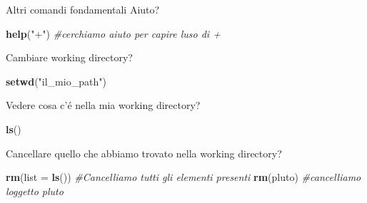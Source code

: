 \documentclass[
  ignorenonframetext,
]{beamer}
\newenvironment{Shaded}{\begin{snugshade}}{\end{snugshade}}
\newcommand{\CommentTok}[1]{\textcolor[rgb]{0.56,0.35,0.01}{\textit{#1}}}
\newcommand{\DataTypeTok}[1]{\textcolor[rgb]{0.13,0.29,0.53}{#1}}
\newcommand{\KeywordTok}[1]{\textcolor[rgb]{0.13,0.29,0.53}{\textbf{#1}}}
\newcommand{\NormalTok}[1]{#1}
\newcommand{\StringTok}[1]{\textcolor[rgb]{0.31,0.60,0.02}{#1}}
\begin{document}
\begin{frame}[fragile]{Altri comandi fondamentali}
\protect\hypertarget{altri-comandi-fondamentali}{}
Aiuto?

\begin{Shaded}
\begin{Highlighting}[]
\KeywordTok{help}\NormalTok{(}\StringTok{"+"}\NormalTok{) }\CommentTok{\#cerchiamo aiuto per capire l\textquotesingle{}uso di +}
\end{Highlighting}
\end{Shaded}

Cambiare working directory?

\begin{Shaded}
\begin{Highlighting}[]
\KeywordTok{setwd}\NormalTok{(}\StringTok{"il\_mio\_path"}\NormalTok{)}
\end{Highlighting}
\end{Shaded}

Vedere cosa c'é nella mia working directory?

\begin{Shaded}
\begin{Highlighting}[]
\KeywordTok{ls}\NormalTok{()}
\end{Highlighting}
\end{Shaded}

Cancellare quello che abbiamo trovato nella working directory?

\begin{Shaded}
\begin{Highlighting}[]
\KeywordTok{rm}\NormalTok{(}\DataTypeTok{list =} \KeywordTok{ls}\NormalTok{()) }\CommentTok{\#Cancelliamo tutti gli elementi presenti}
\KeywordTok{rm}\NormalTok{(pluto) }\CommentTok{\#cancelliamo l\textquotesingle{}oggetto pluto}
\end{Highlighting}
\end{Shaded}
\end{frame}
\end{document}
